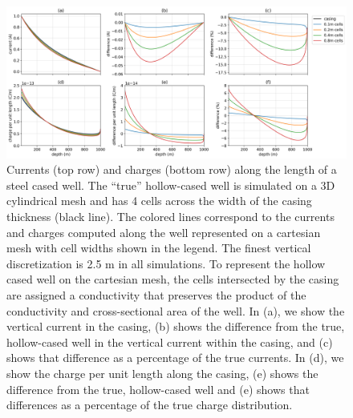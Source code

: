 \begin{figure}
    \begin{center}
    \includegraphics[width=\textwidth]{figures/dc_casing/approximating_wells_cartesian.png}
    \end{center}
\caption{
    Currents (top row) and charges (bottom row) along the length of
    a steel cased well. The ``true'' hollow-cased well is simulated on a
    3D cylindrical mesh and has 4 cells across the width of the casing thickness (black line).
    The colored lines correspond to the currents and charges computed along the
    well represented on a cartesian mesh with cell widths shown in the legend.
    The finest vertical discretization is 2.5 m in all simulations. To represent the
    hollow cased well on the cartesian mesh, the cells intersected by the casing are assigned
    a conductivity that preserves the product of the conductivity and cross-sectional area of the well.
    In (a), we show the vertical current in the casing,
    (b) shows the difference from the true, hollow-cased well
    in the vertical current within the casing, and (c) shows that difference as a percentage
    of the true currents. In (d), we show the charge per unit length along the casing, (e)
    shows the difference from the true, hollow-cased well and (e) shows that differences as
    a percentage of the true charge distribution.
}
\label{fig:approximating_wells_cartesian}
\end{figure}
